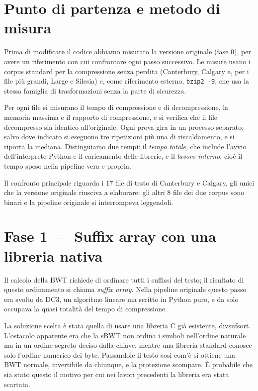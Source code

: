\documentclass[11pt,a4paper]{article}
\begin{document}
\section{Punto di partenza e metodo di misura}

Prima di modificare il codice abbiamo misurato la versione originale (fase 0), per avere
un riferimento con cui confrontare ogni passo successivo. Le misure usano i corpus
standard per la compressione senza perdita (Canterbury, Calgary e, per i file più grandi,
Large e Silesia) e, come riferimento esterno, \texttt{bzip2 -9}, che usa la stessa famiglia
di trasformazioni senza la parte di sicurezza.

Per ogni file si misurano il tempo di compressione e di decompressione, la memoria
massima e il rapporto di compressione, e si verifica che il file decompresso sia identico
all'originale. Ogni prova gira in un processo separato; salvo dove indicato si eseguono tre
ripetizioni più una di riscaldamento, e si riporta la mediana. Distinguiamo due tempi: il
\emph{tempo totale}, che include l'avvio dell'interprete Python e il caricamento delle
librerie, e il \emph{lavoro interno}, cioè il tempo speso nella pipeline vera e propria.

Il confronto principale riguarda i 17 file di testo di Canterbury e Calgary, gli unici che
la versione originale riusciva a elaborare: gli altri 8 file dei due corpus sono binari e
la pipeline originale si interrompeva leggendoli.

\section{Fase 1 --- Suffix array con una libreria nativa}

Il calcolo della BWT richiede di ordinare tutti i suffissi del testo; il risultato di
questo ordinamento si chiama \emph{suffix array}. Nella pipeline originale questo passo
era svolto da DC3, un algoritmo lineare ma scritto in Python puro, e da solo occupava la
quasi totalità del tempo di compressione.

La soluzione scelta è stata quella di usare una libreria C già esistente, divsufsort.
L'ostacolo apparente era che la sBWT non ordina i simboli nell'ordine naturale ma in un
ordine segreto deciso dalla chiave, mentre una libreria standard conosce solo l'ordine
numerico dei byte. Passandole il testo così com'è si ottiene una BWT normale, invertibile
da chiunque, e la protezione scompare. È probabile che sia stato questo il motivo per cui
nei lavori precedenti la libreria era stata scartata.
\end{document}

